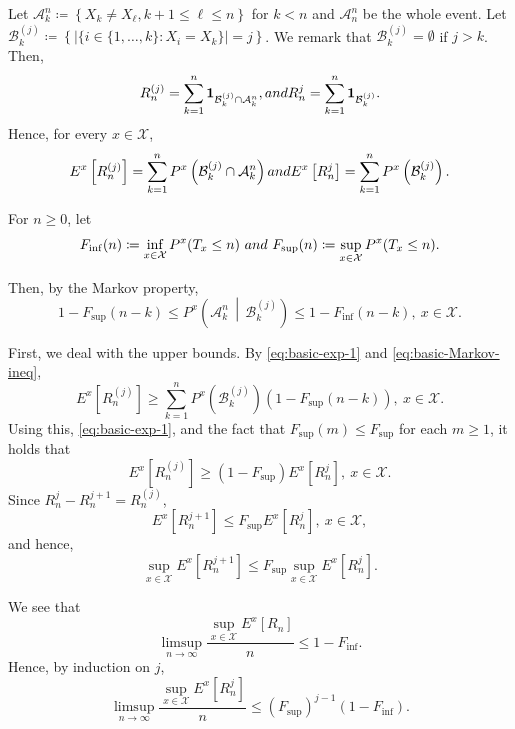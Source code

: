 \documentclass[10pt,a4paper]{amsart}
\begin{document}
Let $\mathcal{A}_{k}^{n} \coloneqq \left\{X_k \ne X_{\ell}, k+1 \le \ell \le n \right\}$ for $k < n$ and $\mathcal{A}_{n}^{n}$ be the whole event. 
Let $\mathcal{B}_{k}^{(j)} \coloneqq \left\{   |\{i \in \{1,\dots,k\} : X_i = X_{k} \}| =  j \right\}$. 
We remark that $\mathcal{B}_{k}^{(j)} = \emptyset$ if $j > k$.  
Then, 
\[ R^{(j)}_{n} = \sum_{k=1}^{n} {\bf 1}_{\mathcal{B}_{k}^{(j)} \cap \mathcal{A}_{k}^{n}}, \textup{ and } R^{j}_{n} = \sum_{k=1}^{n} {\bf 1}_{\mathcal{B}_{k}^{(j)}}. \] 
Hence, for every $x \in \mathcal{X}$, 
\begin{equation}\label{eq:basic-exp-1} 
E^x \left[ R^{(j)}_{n} \right] = \sum_{k=1}^{n} P^x \left(\mathcal{B}_{k}^{(j)} \cap \mathcal{A}_{k}^{n}\right) \textup{ and } E^x \left[ R^{j}_{n} \right] = \sum_{k=1}^{n} P^x \left(\mathcal{B}_{k}^{(j)} \right). 
\end{equation}

For $n \ge 0$, let  
\[ F_{\inf} (n) \coloneqq \inf_{x \in \mathcal{X}} P^x (T_x \le n) \ \textup{ and } \   F_{\sup} (n) \coloneqq \sup_{x \in \mathcal{X}} P^x (T_x \le n).  \]

Then, by the Markov property, 
\begin{equation}\label{eq:basic-Markov-ineq} 
1 - F_{\sup}(n-k) \le P^x \left( \mathcal{A}_{k}^{n} \, \middle| \, \mathcal{B}_{k}^{(j)} \right) \le 1 - F_{\inf}(n-k), \ x \in \mathcal{X}. 
\end{equation}


First, we deal with the upper bounds. 
By \eqref{eq:basic-exp-1} and \eqref{eq:basic-Markov-ineq}, 
\[ E^x \left[ R^{(j)}_{n} \right] \ge \sum_{k=1}^{n} P^x \left(\mathcal{B}_{k}^{(j)} \right) (1- F_{\sup}(n-k)), \ x \in \mathcal{X}. \]
Using this, \eqref{eq:basic-exp-1}, and the fact that $F_{\sup}(m) \le F_{\sup}$ for each $m \ge 1$,   
it holds that 
\begin{equation}\label{eq:comparision-ineq-1} 
E^x \left[ R^{(j)}_{n} \right] \ge (1-F_{\sup}) E^x \left[ R^{j}_{n} \right], \ x \in \mathcal{X}. 
\end{equation}
Since $R_n^j - R_n^{j+1} = R_n^{(j)}$, 
\[ E^x \left[ R^{j+1}_{n} \right] \le F_{\sup} E^x \left[ R^{j}_{n} \right], \ x \in \mathcal{X}, \]
and hence, 
\begin{equation}\label{eq:exp-unif-upperbound} 
\sup_{x \in \mathcal{X}} E^x \left[ R^{j+1}_{n} \right] \le F_{\sup}  \sup_{x \in \mathcal{X}} E^x \left[ R^{j}_{n} \right]. 
\end{equation}

We see that 
\[ \limsup_{n \to \infty} \frac{\sup_{x \in \mathcal{X}} E^{x} \left[R_n \right]}{n} \le 1 - F_{\inf}. \]
Hence, by induction on $j$, 
\begin{equation}\label{eq:upper-exp-1} 
\limsup_{n \to \infty} \frac{\sup_{x \in \mathcal{X}} E^{x} \left[R_n^j \right]}{n} \le (F_{\sup})^{j-1} (1 - F_{\inf}). 
\end{equation}
\end{document}

